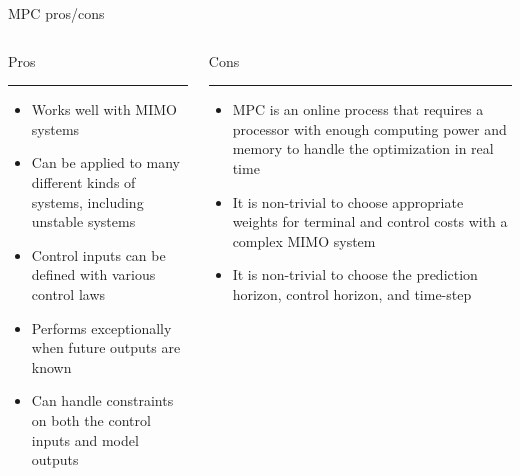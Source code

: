 \documentclass[aspectratio=169]{beamer}
\begin{document}
\begin{frame}{MPC pros/cons}
    \begin{columns}
    
    \begin{column}{0.5\textwidth}
    \centering
    Pros\\
    \hrule
    \hfill
    \begin{itemize}
        \item Works well with MIMO systems
        \item Can be applied to many different kinds of systems, including unstable systems
        \item Control inputs can be defined with various control laws
        \item Performs exceptionally when future outputs are known
        \item Can handle constraints on both the control inputs and model outputs
    \end{itemize}
    \end{column}
    \begin{column}{0.5\textwidth}
    \centering
    Cons\\
    \hrule
    \hfill
    \begin{itemize}
        \item MPC is an online process that requires a processor with enough computing power and memory to handle the optimization in real time
        \item It is non-trivial to choose appropriate weights for terminal and control costs with a complex MIMO system
        \item It is non-trivial to choose the prediction horizon, control horizon, and time-step
    \end{itemize}
    \end{column}
    \end{columns}
\end{frame}
\end{document}
